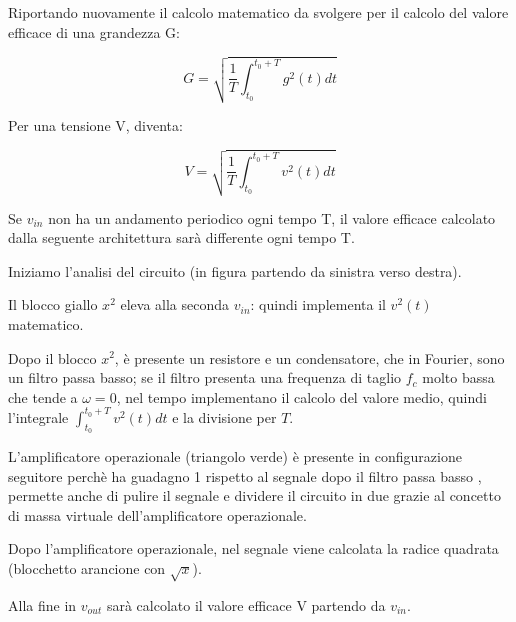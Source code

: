 Riportando nuovamente il calcolo matematico da svolgere per il calcolo del valore efficace di una grandezza G: 

{
    \Large 
    \begin{equation}
        G 
        = 
        \sqrt
        {
            \frac{1}{T}
            \int_{t_0}^{t_0 + T} 
            g^{2} (t) dt
        }
    \end{equation}
}

Per una tensione V, diventa: 

{
    \Large 
    \begin{equation}
        V 
        = 
        \sqrt
        {
            \frac{1}{T}
            \int_{t_0}^{t_0 + T} 
            v^{2} (t) dt
        }
    \end{equation}
}

Se $v_{in}$ non ha un andamento periodico ogni tempo T, il valore efficace calcolato dalla seguente architettura sarà differente ogni tempo T. \newline

Iniziamo l'analisi del circuito (in figura partendo da sinistra verso destra). \newline 

Il blocco giallo $x^{2}$ eleva alla seconda $v_{in}$: 
quindi implementa il $v^{2} (t)$ matematico. \newline 

Dopo il blocco $x^{2}$, è presente un resistore e un condensatore, che in Fourier, sono un filtro passa basso; 
se il filtro presenta una frequenza di taglio $f_c$ molto bassa che tende a $\omega = 0$, nel tempo implementano il calcolo del valore medio, quindi l'integrale $\int_{t_0}^{t_0 + T} v^{2} (t) dt$ e la divisione per $T$. \newline 

L'amplificatore operazionale (triangolo verde) è presente in configurazione seguitore perchè ha guadagno 1 rispetto al segnale dopo il filtro passa basso , 
permette anche di pulire il segnale e dividere il circuito in due grazie al concetto di massa virtuale dell'amplificatore operazionale. \newline 

Dopo l'amplificatore operazionale, nel segnale viene calcolata la radice quadrata (blocchetto arancione con $\sqrt{x}$). \newline 

Alla fine in $v_{out}$ sarà calcolato il valore efficace V partendo da $v_{in}$. \newline 

